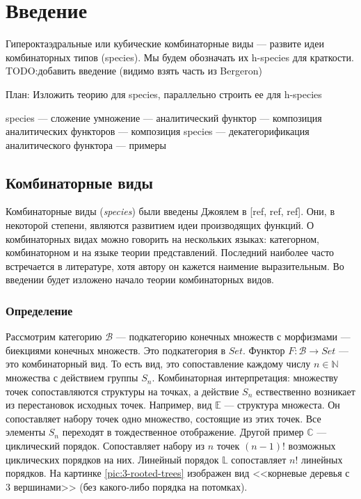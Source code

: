\section{Введение}

Гипероктаэдральные или кубические комбинаторные виды --- развите идеи комбинаторных типов (species).
Мы будем обозначать их h-species для краткости.
TODO:добавить введение (видимо взять часть из Bergeron)

План:
Изложить теорию для species, параллельно строить ее для h-species

species --- сложение умножение --- аналитический функтор --- композиция
аналитических функторов --- композиция species --- декатегорификация
аналитического функтора --- примеры

\subsection{Комбинаторные виды}
Комбинаторные виды (\emph{species}) были введены Джоялем в [ref, ref, ref].
Они, в некоторой степени, являются развитием идеи производящих функций.
О комбинаторных видах можно говорить на нескольких языках: категорном,
комбинаторном и на языке теории представлений. Последний наиболее часто
встречается в литературе, хотя автору он кажется наимение выразительным.
Во введении будет изложено начало теории комбинаторных видов.
\subsubsection{Определение}
Рассмотрим категорию $\mathcal B$ --- подкатегорию конечных множеств с
морфизмами --- биекциями конечных множеств. Это подкатегория в $Set$. Функтор
$F:\mathcal B \rightarrow Set$ --- это комбинаторный вид. То есть вид, это
сопоставление каждому числу $n \in \mathbb N$ множества с действием группы
$S_n$. Комбинаторная интерпретация: множеству точек сопоставляются
структуры на точках, а действие $S_n$ ествественно возникает из перестановок
исходных точек. Например, вид $\mathbb E$ --- структура множеста. Он
сопоставляет набору точек одно множество, состоящие из этих точек. Все элементы $S_n$
переходят в тождественное отображение. Другой пример $\mathbb C$ --- циклический
порядок. Сопоставляет набору из $n$ точек $(n-1)!$ возможных циклических
порядков на них. Линейный порядок $\mathbb L$ сопоставляет $n!$ линейных
порядков. На картинке \ref{pic:3-rooted-trees} изображен вид <<корневые
деревья с 3 вершинами>> (без какого-либо порядка на потомках).

